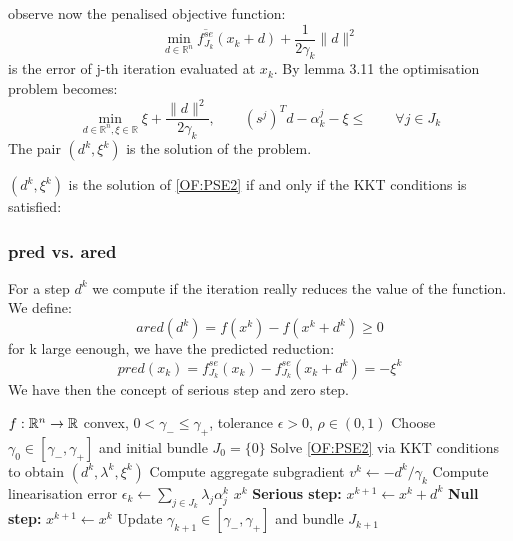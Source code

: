 observe now the penalised objective function:
\begin{equation*}
	\min_{d \in \mathbb{R}^n } \overline{f^{se}_{J_k}}(x_k + d) + \frac{1}{2 \gamma_k} \| d\|^2
\end{equation*}
is the error of j-th iteration evaluated at $x_k$. By lemma 3.11 the optimisation problem becomes:
\begin{equation} 
	\min_{d \in \mathbb{R}^n, \xi \in \mathbb{R}} \xi + \frac{\|d\|^2}{2\gamma_k}, \qquad (s^j)^T d - \alpha_k^j - \xi \leq  \qquad \forall j \in J_k
\label{OF:PSE2}
\end{equation}
The pair $(d^k, \xi^k)$ is the solution of the problem.


\begin{lemma}
	$(d^k, \xi^k)$ is the solution of \ref{OF:PSE2} if and only if the KKT conditions is satisfied:
	\begin{equation*}
		\
	\end{equation*}
\end{lemma}

\subsubsection*{pred vs. ared}
For a step $d^k$ we compute if the iteration really reduces the value of the function. We define:
\begin{equation*}
	ared(d^k) = f(x^k) - f(x^k + d^k) \geq 0
\end{equation*}
for k large eenough, we have the predicted reduction:
\begin{equation*}
	pred(x_k) = f_{J_k}^{se}(x_k) - f_{J_k}^{se}(x_k + d^k) = -\xi^k
\end{equation*}
We have then the concept of serious step and zero step.

\begin{algorithm}
\caption{Bundle method}
\begin{algorithmic}[1]
\Require $f:\mathbb{R}^n \to \mathbb{R}$ convex, $0 < \gamma_- \le \gamma_+$, tolerance $\epsilon > 0$, $\rho \in (0,1)$
\State Choose $\gamma_0 \in [\gamma_-, \gamma_+]$ and initial bundle $J_0 = \{0\}$
\For{$k = 1, 2, \dots$}
  \State Solve \eqref{OF:PSE2} via KKT conditions to obtain $(d^k, \lambda^k, \xi^k)$
  \State Compute aggregate subgradient $v^k \gets -d^k / \gamma_k$
  \State Compute linearisation error $\epsilon_k \gets \textstyle\sum_{j \in J_k} \lambda_j \alpha_j^k$
  \If{$\|v^k\| \le \epsilon$ \textbf{or} $\epsilon_k \le \epsilon$}
    \State \Return $x^k$
  \EndIf
    \State \textbf{Serious step:} $x^{k+1} \gets x^k + d^k$
  \Else
    \State \textbf{Null step:} $x^{k+1} \gets x^k$
  \EndIf
  \State Update $\gamma_{k+1} \in [\gamma_-, \gamma_+]$ and bundle $J_{k+1}$
\EndFor
\end{algorithmic}
\end{algorithm}


